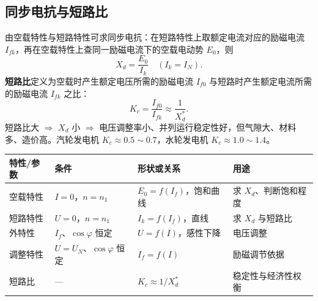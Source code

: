 \subsection{同步电抗与短路比}
由空载特性与短路特性可求同步电抗：在短路特性上取额定电流对应的励磁电流 $I_{fk}$，再在空载特性上查同一励磁电流下的空载电动势 $E_0$，则
\begin{equation}
X_d=\frac{E_0}{I_k}\quad\left(I_k=I_N\right).
\end{equation}
\textbf{短路比}定义为空载时产生额定电压所需的励磁电流 $I_{f0}$ 与短路时产生额定电流所需的励磁电流 $I_{fk}$ 之比：
\begin{equation}
K_c=\frac{I_{f0}}{I_{fk}}\approx\frac{1}{X_d^{*}} .
\end{equation}
短路比大 $\Rightarrow$ $X_d$ 小 $\Rightarrow$ 电压调整率小、并列运行稳定性好，但气隙大、材料多、造价高。汽轮发电机 $K_c\approx0.5\sim0.7$，水轮发电机 $K_c\approx1.0\sim1.4$。

\begin{center}
\begin{tabular}{@{}p{2.2cm}p{3.6cm}p{4.2cm}p{3.0cm}@{}}
\toprule
特性/参数 & 条件 & 形状或关系 & 用途 \\
\midrule
空载特性 & $I=0$，$n=n_1$ & $E_0=f(I_f)$，饱和曲线 & 求 $X_d$、判断饱和程度 \\
短路特性 & $U=0$，$n=n_1$ & $I_k=f(I_f)$，直线 & 求 $X_d$ 与短路比 \\
外特性 & $I_f$、$\cos\varphi$ 恒定 & $U=f(I)$，感性下降 & 电压调整 \\
调整特性 & $U=U_N$、$\cos\varphi$ 恒定 & $I_f=f(I)$ & 励磁调节依据 \\
短路比 & — & $K_c\approx1/X_d^{*}$ & 稳定性与经济性权衡 \\
\bottomrule
\end{tabular}
\end{center}


